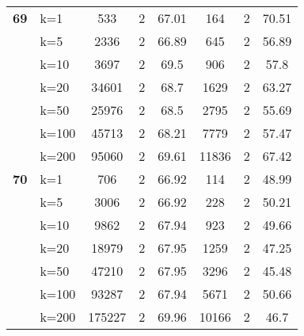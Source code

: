 \begin{table}[htbp]
\begin{tabular}{|l|l|c|c|c|c|c|c|}
    \multicolumn{1}{|r|}{\textbf{69}} & k=1 & 533 & 2 & 67.01 & 164 & 2 & 70.51 \\ 
     & k=5 & 2336 & 2 & 66.89 & 645 & 2 & 56.89 \\ 
     & k=10 & 3697 & 2 & 69.5 & 906 & 2 & 57.8 \\ 
     & k=20 & 34601 & 2 & 68.7 & 1629 & 2 & 63.27 \\ 
     & k=50 & 25976 & 2 & 68.5 & 2795 & 2 & 55.69 \\ 
     & k=100 & 45713 & 2 & 68.21 & 7779 & 2 & 57.47 \\ 
     & k=200 & 95060 & 2 & 69.61 & 11836 & 2 & 67.42 \\ \hline
    \multicolumn{1}{|r|}{\textbf{70}} & k=1 & 706 & 2 & 66.92 & 114 & 2 & 48.99 \\ 
     & k=5 & 3006 & 2 & 66.92 & 228 & 2 & 50.21 \\ 
     & k=10 & 9862 & 2 & 67.94 & 923 & 2 & 49.66 \\ 
     & k=20 & 18979 & 2 & 67.95 & 1259 & 2 & 47.25 \\ 
     & k=50 & 47210 & 2 & 67.95 & 3296 & 2 & 45.48 \\ 
     & k=100 & 93287 & 2 & 67.94 & 5671 & 2 & 50.66 \\ 
     & k=200 & 175227 & 2 & 69.96 & 10166 & 2 & 46.7 \\ \hline
    \end{tabular}
\end{table}
